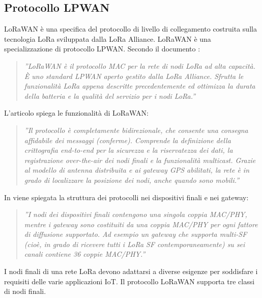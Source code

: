 \documentclass[a4paper]{report} %
\begin{document}
\subsection{Protocollo LPWAN}
LoRaWAN è una specifica del protocollo di livello di collegamento costruita sulla tecnologia LoRa sviluppata dalla LoRa Alliance.%
LoRaWAN è una specializzazione di protocollo LPWAN. Secondo il documento \cite{art:rif.24}:
\begin{quote}
	\textit{''LoRaWAN è il protocollo MAC per la rete di nodi LoRa ad alta capacità. È uno standard LPWAN aperto gestito dalla LoRa Alliance. Sfrutta le funzionalità LoRa appena descritte precedentemente ed ottimizza la durata della batteria e la qualità del servizio per i nodi LoRa.''}
\end{quote}
L'articolo \cite{art:rif.30} spiega le funzionalità di LoRaWAN:
\begin{quote}
	\textit{''Il protocollo è completamente bidirezionale, che consente una consegna affidabile dei messaggi (conferme). Comprende la definizione della crittografia end-to-end per la sicurezza e la riservatezza dei dati, la registrazione over-the-air dei nodi finali e la funzionalità multicast. Grazie al modello di antenna distribuita e ai gateway GPS abilitati, la rete è in grado di localizzare la posizione dei nodi, anche quando sono mobili.''}
\end{quote}
In \cite{art:rif.49} viene spiegata la struttura dei protocolli nei dispositivi finali e nei gateway:
\begin{quote}
	\textit{''I nodi dei dispositivi finali contengono una singola coppia MAC/PHY, mentre i gateway sono costituiti da una coppia MAC/PHY per ogni fattore di diffusione supportato. Ad esempio un gateway che supporta multi-SF (cioè, in grado di ricevere tutti i LoRa SF contemporaneamente) su sei canali contiene 36 coppie MAC/PHY.''}
\end{quote}
I nodi finali di una rete LoRa devono adattarsi a diverse esigenze per soddisfare i requisiti delle varie applicazioni IoT. Il protocollo LoRaWAN supporta tre classi di nodi finali.
\end{document}
